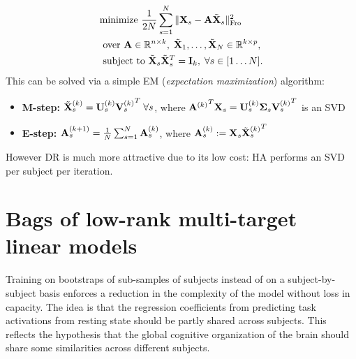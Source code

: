 \begin{eqnarray}
  \begin{split}
    &\text{minimize }\frac{1}{2N}\sum_{s=1}^N\|\mathbf{X}_s - \mathbf{A}\tilde{\mathbf{X}}_s\|^2_{\text{Fro}}\\
    &\text{ over }
  \mathbf{A} \in \mathbb R^{n \times k},\;\tilde{\mathbf{X}}_1,\ldots,\tilde{\mathbf{X}}_N \in \mathbb R^{k \times p},
  \\
  &\text{ subject to }\tilde{\mathbf{X}}_s\tilde{\mathbf{X}}_s^T = \mathbf{I}_k,\; \forall s \in [1\ldots N].
  \end{split}
\end{eqnarray}
This can be solved via a simple EM (\textit{expectation maximization}) algorithm:

\begin{itemize}
\item \textbf{M-step:} $\tilde{\mathbf{X}}_s^{(k)} = \mathbf{U}_s^{(k)}{\mathbf{V}_s^{(k)}}^T\; \forall s$, where ${\mathbf{A}^{(k)}}^T\mathbf{X}_s = \mathbf{U}_s^{(k)}\boldsymbol{\Sigma}_s{\mathbf{V}_s^{(k)}}^T$ is an SVD
\item \textbf{E-step:} $\mathbf{A}_s^{(k+1)} = \frac{1}{N}\sum_{s=1}^N\mathbf{A}_s^{(k)}$, where $\mathbf{A}_s^{(k)} := \mathbf{X}_s{{}\tilde{\mathbf{X}}_s^{(k)}}^T$
\end{itemize}

However DR is much more attractive due to its low cost: HA performs an SVD per subject per iteration.

\section{Bags of low-rank multi-target linear models}
\label{sec:bags}
Training on bootstraps of sub-samples of subjects instead of on a subject-by-subject
basis enforces a reduction in the complexity of the model without loss in capacity.
The idea is that the regression coefficients from predicting task activations
from resting state should be partly shared across subjects. 
%
This reflects the hypothesis that the global cognitive organization of the brain should share some
similarities across different subjects.

